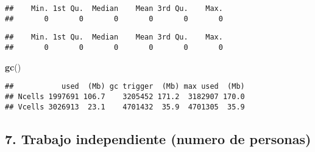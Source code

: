 \documentclass[11pt,]{article}
\newenvironment{Shaded}{\begin{snugshade}}{\end{snugshade}}
\newcommand{\KeywordTok}[1]{\textcolor[rgb]{0.13,0.29,0.53}{\textbf{#1}}}
\newcommand{\OperatorTok}[1]{\textcolor[rgb]{0.81,0.36,0.00}{\textbf{#1}}}
\newcommand{\NormalTok}[1]{#1}
\begin{document}
\begin{Shaded}
\end{Shaded}

\begin{verbatim}
##    Min. 1st Qu.  Median    Mean 3rd Qu.    Max. 
##       0       0       0       0       0       0
\end{verbatim}

\begin{Shaded}
\end{Shaded}

\begin{verbatim}
##    Min. 1st Qu.  Median    Mean 3rd Qu.    Max. 
##       0       0       0       0       0       0
\end{verbatim}

\begin{Shaded}
\begin{Highlighting}[]
\KeywordTok{gc}\NormalTok{()}
\end{Highlighting}
\end{Shaded}

\begin{verbatim}
##           used  (Mb) gc trigger  (Mb) max used  (Mb)
## Ncells 1997691 106.7    3205452 171.2  3182907 170.0
## Vcells 3026913  23.1    4701432  35.9  4701305  35.9
\end{verbatim}

\subsection{7. Trabajo independiente (numero de
personas)}\label{trabajo-independiente-numero-de-personas}
\end{document}
